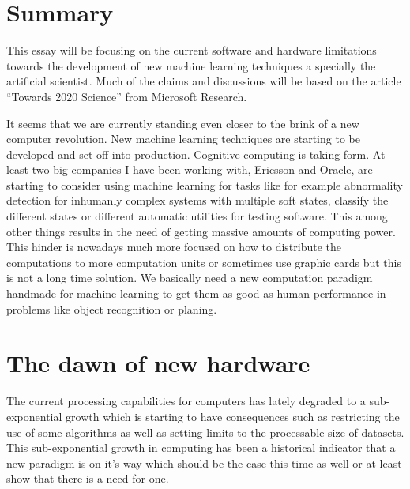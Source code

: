 \documentclass{article}
\begin{document}

\section{Summary}
    This essay will be focusing on the current software and hardware limitations
    towards the development of new machine learning techniques a specially the
    artificial scientist. Much of the claims and discussions will be based on
    the article ``Towards 2020 Science'' from Microsoft Research.\cite{ms2020}

    It seems that we are currently standing even closer to the brink of a new 
    computer revolution. New machine learning techniques are starting to be 
    developed and set off into production. Cognitive computing is taking form.
    At least two big companies I have been working with, Ericsson and Oracle, 
    are starting to consider using machine learning for tasks like for example 
    abnormality detection for inhumanly complex systems with multiple soft
    states, classify the different states or different automatic utilities for
    testing software. This among other things results in the need of getting 
    massive amounts of computing power. This hinder is nowadays much more 
    focused on how to distribute the computations to more computation units or 
    sometimes use graphic cards but this is not a long time solution. We 
    basically need a new computation paradigm handmade for machine learning to 
    get them as good as human performance in problems like object recognition 
    or planing.



\section{The dawn of new hardware}
    The current processing capabilities for computers has lately degraded to a
    sub-exponential growth which is starting to have consequences such as 
    restricting the use of some algorithms as well as setting limits 
    to the processable size of datasets.
    This sub-exponential growth in computing has been a historical indicator
    that a new paradigm is on it's way which should be the case this time as
    well or at least show that there is a need for one.
    
\end{document}
